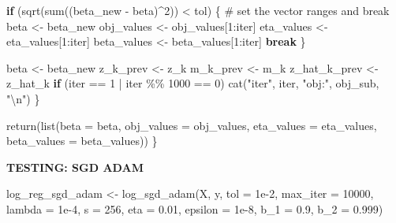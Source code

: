 \documentclass[
  letterpaper,
  DIV=11,
  numbers=noendperiod]{scrartcl}
\newenvironment{Shaded}{\begin{snugshade}}{\end{snugshade}}
\newcommand{\AttributeTok}[1]{\textcolor[rgb]{0.40,0.45,0.13}{#1}}
\newcommand{\CommentTok}[1]{\textcolor[rgb]{0.37,0.37,0.37}{#1}}
\newcommand{\ControlFlowTok}[1]{\textcolor[rgb]{0.00,0.23,0.31}{\textbf{#1}}}
\newcommand{\DecValTok}[1]{\textcolor[rgb]{0.68,0.00,0.00}{#1}}
\newcommand{\FloatTok}[1]{\textcolor[rgb]{0.68,0.00,0.00}{#1}}
\newcommand{\FunctionTok}[1]{\textcolor[rgb]{0.28,0.35,0.67}{#1}}
\newcommand{\NormalTok}[1]{\textcolor[rgb]{0.00,0.23,0.31}{#1}}
\newcommand{\OtherTok}[1]{\textcolor[rgb]{0.00,0.23,0.31}{#1}}
\newcommand{\SpecialCharTok}[1]{\textcolor[rgb]{0.37,0.37,0.37}{#1}}
\newcommand{\StringTok}[1]{\textcolor[rgb]{0.13,0.47,0.30}{#1}}
\begin{document}
\begin{Shaded}
\begin{Highlighting}[]
    \ControlFlowTok{if}\NormalTok{ (}\FunctionTok{sqrt}\NormalTok{(}\FunctionTok{sum}\NormalTok{((beta\_new }\SpecialCharTok{{-}}\NormalTok{ beta)}\SpecialCharTok{\^{}}\DecValTok{2}\NormalTok{)) }\SpecialCharTok{\textless{}}\NormalTok{ tol) \{}
      \CommentTok{\# set the vector ranges and break}
\NormalTok{      beta }\OtherTok{\textless{}{-}}\NormalTok{ beta\_new}
\NormalTok{      obj\_values }\OtherTok{\textless{}{-}}\NormalTok{ obj\_values[}\DecValTok{1}\SpecialCharTok{:}\NormalTok{iter]}
\NormalTok{      eta\_values }\OtherTok{\textless{}{-}}\NormalTok{ eta\_values[}\DecValTok{1}\SpecialCharTok{:}\NormalTok{iter]}
\NormalTok{      beta\_values }\OtherTok{\textless{}{-}}\NormalTok{ beta\_values[}\DecValTok{1}\SpecialCharTok{:}\NormalTok{iter]}
      \ControlFlowTok{break}
\NormalTok{    \}}
    
\NormalTok{    beta }\OtherTok{\textless{}{-}}\NormalTok{ beta\_new}
\NormalTok{    z\_k\_prev }\OtherTok{\textless{}{-}}\NormalTok{ z\_k}
\NormalTok{    m\_k\_prev }\OtherTok{\textless{}{-}}\NormalTok{ m\_k}
\NormalTok{    z\_hat\_k\_prev }\OtherTok{\textless{}{-}}\NormalTok{ z\_hat\_k}
    \ControlFlowTok{if}\NormalTok{ (iter }\SpecialCharTok{==} \DecValTok{1} \SpecialCharTok{|}\NormalTok{ iter }\SpecialCharTok{\%\%} \DecValTok{1000} \SpecialCharTok{==} \DecValTok{0}\NormalTok{) }\FunctionTok{cat}\NormalTok{(}\StringTok{"iter"}\NormalTok{, iter, }\StringTok{"obj:"}\NormalTok{, obj\_sub, }\StringTok{"}\SpecialCharTok{\textbackslash{}n}\StringTok{"}\NormalTok{)}
\NormalTok{  \}}
  
  \FunctionTok{return}\NormalTok{(}\FunctionTok{list}\NormalTok{(}\AttributeTok{beta =}\NormalTok{ beta, }\AttributeTok{obj\_values =}\NormalTok{ obj\_values, }\AttributeTok{eta\_values =}\NormalTok{ eta\_values, }\AttributeTok{beta\_values =}\NormalTok{ beta\_values))}
\NormalTok{\}}
\end{Highlighting}
\end{Shaded}

\textbf{TESTING: SGD ADAM}

\begin{Shaded}
\begin{Highlighting}[]
\NormalTok{log\_reg\_sgd\_adam }\OtherTok{\textless{}{-}} \FunctionTok{log\_sgd\_adam}\NormalTok{(X, y, }\AttributeTok{tol =} \FloatTok{1e{-}2}\NormalTok{, }\AttributeTok{max\_iter =} \DecValTok{10000}\NormalTok{, }\AttributeTok{lambda =} \FloatTok{1e{-}4}\NormalTok{, }\AttributeTok{s =} \DecValTok{256}\NormalTok{, }\AttributeTok{eta =} \FloatTok{0.01}\NormalTok{, }\AttributeTok{epsilon =} \FloatTok{1e{-}8}\NormalTok{, }\AttributeTok{b\_1 =} \FloatTok{0.9}\NormalTok{, }\AttributeTok{b\_2 =} \FloatTok{0.999}\NormalTok{)}
\end{Highlighting}
\end{Shaded}
\end{document}
